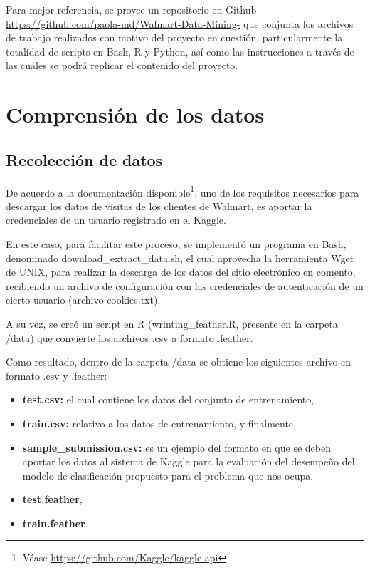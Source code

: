 \documentclass[]{book}
\providecommand{\tightlist}{%
  \setlength{\itemsep}{0pt}\setlength{\parskip}{0pt}}
\let\rmarkdownfootnote\footnote%
\def\footnote{\protect\rmarkdownfootnote}
\begin{document}
Para mejor referencia, se provee un repositorio en Github \url{https://github.com/paola-md/Walmart-Data-Mining-} que conjunta los archivos de trabajo realizados con motivo del proyecto en cuestión, particularmente la totalidad de scripts en Bash, R y Python, así como las instrucciones a través de las cuales se podrá replicar el contenido del proyecto.

\hypertarget{comprensiuxf3n-de-los-datos}{%
\chapter{Comprensión de los datos}\label{comprensiuxf3n-de-los-datos}}

\hypertarget{recolecciuxf3n-de-datos}{%
\section{Recolección de datos}\label{recolecciuxf3n-de-datos}}

De acuerdo a la documentación disponible\footnote{Véase \url{https://github.com/Kaggle/kaggle-api}}, uno de los requisitos necesarios para descargar los datos de visitas de los clientes de Walmart, es aportar la credenciales de un usuario registrado en el Kaggle.

En este caso, para facilitar este proceso, se implementó un programa en Bash, denominado download\_extract\_data.sh, el cual aprovecha la herramienta Wget de UNIX, para realizar la descarga de los datos del sitio electrónico en comento, recibiendo un archivo de configuración con las credenciales de autenticación de un cierto usuario (archivo cookies.txt).

A su vez, se creó un script en R (wrinting\_feather.R, presente en la carpeta /data) que convierte los archivos .csv a formato .feather.

Como resultado, dentro de la carpeta /data se obtiene los siguientes archivo en formato .csv y .feather:

\begin{itemize}
\tightlist
\item
  \textbf{test.csv:} el cual contiene los datos del conjunto de entrenamiento,
\item
  \textbf{train.csv:} relativo a los datos de entrenamiento, y finalmente,
\item
  \textbf{sample\_submission.csv:} es un ejemplo del formato en que se deben aportar los datos al sistema de Kaggle para la evaluación del desempeño del modelo de clasificación propuesto para el problema que nos ocupa.
\item
  \textbf{test.feather},
\item
  \textbf{train.feather}.
\end{itemize}
\end{document}
